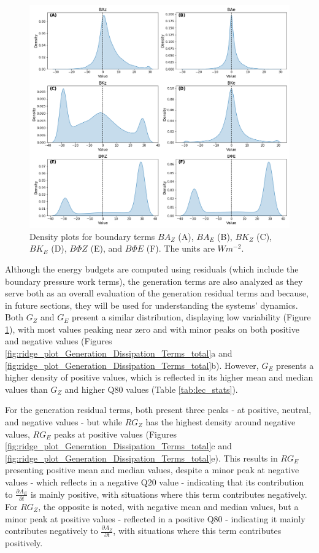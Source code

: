 \begin{figure}[!htbp]
\centering
\includegraphics[width=\textwidth]{figs_5/ridge_plot_Boundary_Terms_total.png}
\caption[Density Plots - Boundary Terms]{Density plots for boundary terms $BA_Z$ (A), $BA_E$ (B), $BK_Z$ (C), $BK_E$ (D), $B\Phi Z$ (E), and  $B\Phi E$ (F). The units are $W m^{-2}$.}
\label{fig:ridge_plot_Boundary_Terms_total}
\end{figure}

Although the energy budgets are computed using residuals (which include the boundary pressure work terms), the generation terms are also analyzed as they serve both as an overall evaluation of the generation residual terms and because, in future sections, they will be used for understanding the systems' dynamics. Both $G_Z$ and $G_E$ present a similar distribution, displaying low variability (Figure \ref{fig:ridge_plot_Boundary_Terms_total}), with most values peaking near zero and with minor peaks on both positive and negative values (Figures \ref{fig:ridge_plot_Generation_Dissipation_Terms_total}a and \ref{fig:ridge_plot_Generation_Dissipation_Terms_total}b). However, $G_E$ presents a higher density of positive values, which is reflected in its higher mean and median values than $G_Z$ and higher Q80 values (Table \ref{tab:lec_stats}). 

For the generation residual terms, both present three peaks - at positive, neutral, and negative values - but while $RG_Z$ has the highest density around negative values, $RG_E$ peaks at positive values (Figures \ref{fig:ridge_plot_Generation_Dissipation_Terms_total}c and \ref{fig:ridge_plot_Generation_Dissipation_Terms_total}e). This results in $RG_E$ presenting positive mean and median values, despite a minor peak at negative values - which reflects in a negative Q20 value - indicating that its contribution to $\frac{\partial A_E}{\partial t}$ is mainly positive, with situations where this term contributes negatively. For $RG_Z$, the opposite is noted, with negative mean and median values, but a minor peak at positive values - reflected in a positive Q80 - indicating it mainly contributes negatively to $\frac{\partial A_Z}{\partial t}$, with situations where this term contributes positively.

